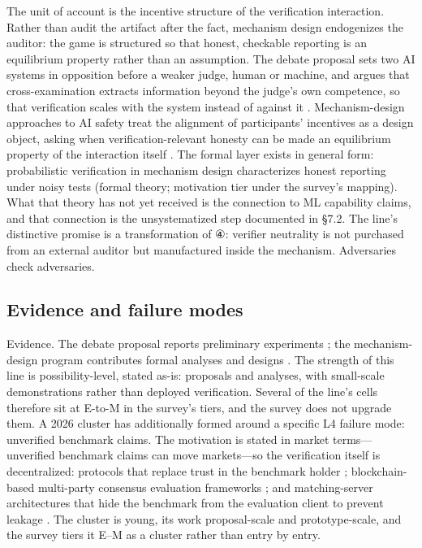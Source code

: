 \documentclass[11pt,a4paper]{article}
\begin{document}
The unit of account is the incentive structure of the verification interaction. Rather than audit the artifact after the fact, mechanism design endogenizes the auditor: the game is structured so that honest, checkable reporting is an equilibrium property rather than an assumption. The debate proposal sets two AI systems in opposition before a weaker judge, human or machine, and argues that cross-examination extracts information beyond the judge's own competence, so that verification scales with the system instead of against it \cite{key09}. Mechanism-design approaches to AI safety treat the alignment of participants' incentives as a design object, asking when verification-relevant honesty can be made an equilibrium property of the interaction itself \cite{key10}. The formal layer exists in general form: probabilistic verification in mechanism design characterizes honest reporting under noisy tests \cite{key43} (formal theory; motivation tier under the survey's mapping). What that theory has not yet received is the connection to ML capability claims, and that connection is the unsystematized step documented in §7.2. The line's distinctive promise is a transformation of ④: verifier neutrality is not purchased from an external auditor but manufactured inside the mechanism. Adversaries check adversaries.

\subsection{Evidence and failure modes}

Evidence. The debate proposal reports preliminary experiments \cite{key09}; the mechanism-design program contributes formal analyses and designs \cite{key10}. The strength of this line is possibility-level, stated as-is: proposals and analyses, with small-scale demonstrations rather than deployed verification. Several of the line's cells therefore sit at E-to-M in the survey's tiers, and the survey does not upgrade them. A 2026 cluster has additionally formed around a specific L4 failure mode: unverified benchmark claims. The motivation is stated in market terms—unverified benchmark claims can move markets—so the verification itself is decentralized: protocols that replace trust in the benchmark holder \cite{key44}; blockchain-based multi-party consensus evaluation frameworks \cite{key45}; and matching-server architectures that hide the benchmark from the evaluation client to prevent leakage \cite{key46}. The cluster is young, its work proposal-scale and prototype-scale, and the survey tiers it E–M as a cluster rather than entry by entry.
\end{document}
